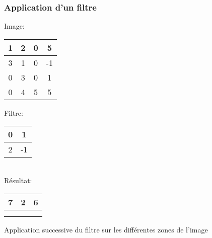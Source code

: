 \documentclass{formation}
\begin{document}
\begin{frame}
  \frametitle{Application d'un filtre}
  \begin{multicols}{2}
    Image:
    \begin{tabular}{|c|c|c|c|}
      \hline
      1 & 2 & \cellcolor{green}0 & \cellcolor{green}5 \\
      \hline
      3 & 1 & \cellcolor{green}0 & \cellcolor{green}-1 \\
      \hline
      0 & 3 & 0 & 1 \\
      \hline
      0 & 4 & 5 & 5 \\
      \hline
    \end{tabular}

    \columnbreak

    Filtre:
    \begin{tabular}{|c|c|}
      \hline
      0 & 1  \\
      \hline
      2 & -1 \\
      \hline
    \end{tabular}\\[.5cm]
    Résultat:
    \begin{tabular}{|c|c|c|}
      \hline
      7 & 2 & 6\\
      \hline
       \phantom{-2} &  & \phantom{-2} \\
      \hline
        &  & \\
      \hline
    \end{tabular}
  \end{multicols}
  Application successive du filtre sur les différentes zones de l'image
\end{frame}
\end{document}
